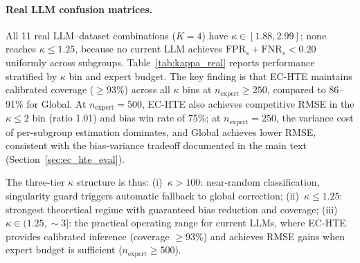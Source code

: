 \paragraph{Real LLM confusion matrices.}
All 11 real LLM--dataset combinations ($K{=}4$) have $\kappa \in [1.88, 2.99]$; none reaches $\kappa \leq 1.25$, because no current LLM achieves $\mathrm{FPR}_s + \mathrm{FNR}_s < 0.20$ uniformly across subgroups.
Table~\ref{tab:kappa_real} reports performance stratified by $\kappa$ bin and expert budget.
The key finding is that EC-HTE maintains calibrated coverage ($\geq$93\%) across all $\kappa$ bins at $n_{\text{expert}} \geq 250$, compared to 86--91\% for Global.
At $n_{\text{expert}}{=}500$, EC-HTE also achieves competitive RMSE in the $\kappa \leq 2$ bin (ratio 1.01) and bias win rate of 75\%; at $n_{\text{expert}}{=}250$, the variance cost of per-subgroup estimation dominates, and Global achieves lower RMSE, consistent with the bias-variance tradeoff documented in the main text (Section~\ref{sec:ec_hte_eval}).

\begin{table}[h]
\centering
\caption{Real LLM $\kappa$ stratification ($K{=}4$, MC validation). Ratios = EC-HTE / Global; values $<1$ favor EC-HTE. Coverage is EC-HTE absolute; Global coverage ranges 0.86--0.91 across bins.}
\label{tab:kappa_real}
\small
{}
\end{table}

The three-tier $\kappa$ structure is thus: (i)~$\kappa > 100$: near-random classification, singularity guard triggers automatic fallback to global correction; (ii)~$\kappa \leq 1.25$: strongest theoretical regime with guaranteed bias reduction and coverage; (iii)~$\kappa \in (1.25, {\sim}3]$: the practical operating range for current LLMs, where EC-HTE provides calibrated inference (coverage $\geq$93\%) and achieves RMSE gains when expert budget is sufficient ($n_{\text{expert}} \geq 500$).

